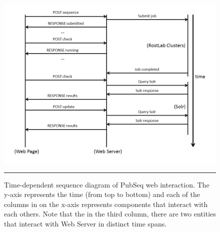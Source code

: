 \begin{figure}[htbp]
  \centering
    \includegraphics[width=6in]{Figures/sequence_diagram.png}
    \rule{35em}{0.5pt}
  \caption[A Sequence Diagram modeling of PubSeq web interaction.]{Time-dependent sequence diagram of PubSeq web interaction. The y-axis represents the time (from top to bottom) and each of the columns in on the x-axis represents components that interact with each others. Note that the in the third column, there are two entities that interact with Web Server in distinct time spans.}
  \label{fig:SequenceDiagram}
\end{figure}

